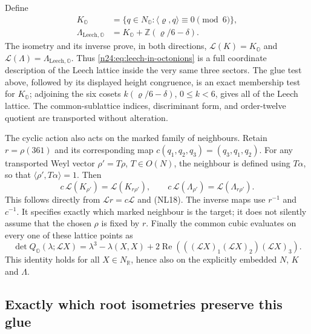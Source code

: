Define
\begin{equation}
 \begin{aligned}
 K_{\mathbb O}&=\{q\in N_{\mathbb O}:
                          \langle\varrho,q\rangle\equiv0\pmod6\},\\
 \Lambda_{\mathrm{Leech},\mathbb O}
       &=K_{\mathbb O}+\mathbb Z(\varrho/6-\delta).
 \end{aligned}
 \label{n24:eq:leech-in-octonions}
\end{equation}
The isometry and its inverse prove, in both directions,
$\mathcal L(K)=K_{\mathbb O}$ and
$\mathcal L(\Lambda)=\Lambda_{\mathrm{Leech},\mathbb O}$.
Thus \eqref{n24:eq:leech-in-octonions} is a full coordinate
description of the Leech lattice inside the very same three sectors.
The glue test above, followed by its displayed height congruence,
is an exact membership test for $K_{\mathbb O}$; adjoining the six
cosets $k(\varrho/6-\delta)$, $0\le k<6$, gives all of the Leech
lattice. The common-sublattice indices, discriminant form, and
order-twelve quotient are transported without alteration.

The cyclic action also acts on the marked family of neighbours.
Retain $r=\rho(361)$ and its corresponding map
$c(q_1,q_2,q_3)=(q_3,q_1,q_2)$.
For any transported Weyl vector $\rho'=T\rho$, $T\in O(N)$,
the neighbour is defined using $T\alpha$, so that
$\langle\rho',T\alpha\rangle=1$. Then
\[
 c\,\mathcal L(K_{\rho'})=\mathcal L(K_{r\rho'}),\qquad
 c\,\mathcal L(\Lambda_{\rho'})=\mathcal L(\Lambda_{r\rho'}).
\]
This follows directly from $\mathcal Lr=c\mathcal L$ and
(NL18). The inverse maps use $r^{-1}$ and $c^{-1}$.
It specifies exactly which marked neighbour is the target; it does
not silently assume that the chosen $\rho$ is fixed by $r$.
Finally the common cubic evaluates on every one of these lattice
points as
\[
 \det Q_{\mathbb O}(\lambda;\mathcal LX)
    =\lambda^3-\lambda(X,X)
                   +2\operatorname{Re}(((\mathcal LX)_1
                                         (\mathcal LX)_2)(\mathcal LX)_3).
\]
This identity holds for all $X\in N_{\mathbb R}$, hence also
on the explicitly embedded $N$, $K$ and $\Lambda$.

\subsection{Exactly which root isometries preserve this glue}
\label{n24:sec:glue-symmetry}

